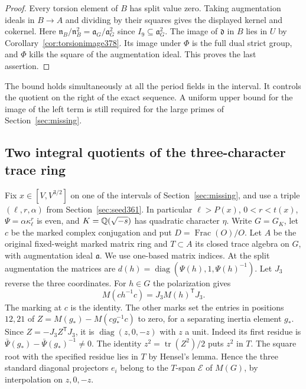 \documentclass[a4paper,11pt]{article}
\theoremstyle{definition}
\theoremstyle{remark}
\numberwithin{equation}{section}
\begin{document}
\begin{proof}
Every torsion element of \(B\) has split value zero.
Taking augmentation ideals in \(B\to A\) and dividing
by their squares gives the displayed kernel and cokernel.
Here \(\mathfrak n_B/\mathfrak n_B^2=\mathfrak a_G/
\mathfrak a_G^2\) since \(I_9\subseteq\mathfrak a_G^2\).
The image of \(\mathfrak d\) in \(B\) lies in \(U\) by
Corollary~\ref{cor:torsionimage378}. Its image under
\(\Phi\) is the full dual strict group, and \(\Phi\) kills
the square of the augmentation ideal. This proves the
last assertion.
\end{proof}

The bound holds simultaneously at all the period fields in
the interval. It controls the quotient on the right of the
exact sequence. A uniform upper bound for the image of the
left term is still required for the large primes of
Section~\ref{sec:missing}.


\subsection{Two integral quotients of the three-character trace ring}
\label{sec:planedesc381}

Fix \(x\in[V,V^{3/2}]\) on one of the intervals of
Section~\ref{sec:missing}, and use a triple
\((\ell,r,\alpha)\) from Section~\ref{sec:seed361}.
In particular \(\ell>P(x)\), \(0<r<t(x)\),
\(\Psi=\alpha\kappa_\ell^r\) is even, and
\(K=\mathbb Q(\sqrt{-s})\) has quadratic character \(\eta\).
Write \(G=G_K\), let \(c\) be the marked complex conjugation
and put \(D=\operatorname{Frac}(O)/O\).
Let \(A\) be the original fixed-weight marked matrix ring and
\(T\subset A\) its closed trace algebra on \(G\), with
augmentation ideal \(\mathfrak a\). We use one-based matrix
indices. At the split augmentation the matrices are
\(d(h)=\operatorname{diag}(\Psi(h),1,\Psi(h)^{-1})\).
Let \(J_3\) reverse the three coordinates. For \(h\in G\)
the polarization gives
\[
 M(ch^{-1}c)=J_3M(h)^{\mathsf T}J_3.
\]
The marking at \(c\) is the identity. The other marks set the
entries in positions \(12,21\) of
\(Z=M(g_*)-M(cg_*^{-1}c)\) to zero, for a separating inertia
element \(g_*\). Since \(Z=-J_3 Z^{\mathsf T}J_3\), it is
\(\operatorname{diag}(z,0,-z)\) with \(z\) a unit.
Indeed its first residue is \(\bar\Psi(g_*)-\bar\Psi(g_*)^{-1}\ne0\).
The identity \(z^2=\operatorname{tr}(Z^2)/2\) puts \(z^2\) in
\(T\). The square root with the specified residue lies in \(T\)
by Hensel's lemma. Hence the three standard diagonal projectors
\(e_i\) belong to the \(T\)-span \(\mathcal E\) of \(M(G)\),
by interpolation on \(z,0,-z\).
\end{document}
